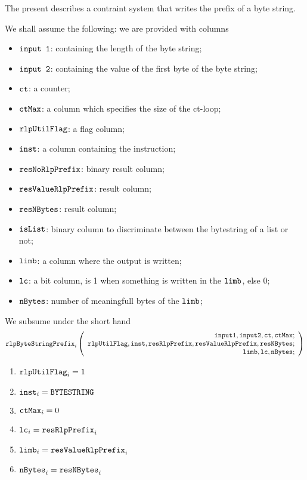 The present describes a contraint system that writes the \rlp{} prefix of a byte string.

We shall assume the following: we are provided with columns
\begin{itemize}
    \item $\texttt{input 1}$: containing the length of the byte string;
    \item $\texttt{input 2}$: containing the value of the first byte of the byte string;
    \item $\texttt{ct}$: a counter;
    \item $\texttt{ctMax}$: a column which specifies the size of the ct-loop;

    \item $\texttt{rlpUtilFlag}$: a flag column;
    \item $\texttt{inst}$: a column containing the instruction;
    \item $\texttt{resNoRlpPrefix}$: binary result column;
    \item $\texttt{resValueRlpPrefix}$: result column;
    \item $\texttt{resNBytes}$: result column;
    \item $\texttt{isList}$: binary column to discriminate between the bytestring of a list or not;

    \item $\texttt{limb}$: a column where the output is written;
    \item $\texttt{lc}$: a bit column, is 1 when something is written in the $\texttt{limb}$, else 0;
    \item $\texttt{nBytes}$: number of meaningfull bytes of the $\texttt{limb}$;
\end{itemize}

\noindent We subsume under the short hand
\[
    \texttt{rlpByteStringPrefix}_{i}
    \left(
	\begin{array}{r}
    \texttt{input1},
    \texttt{input2},
    \texttt{ct},
    \texttt{ctMax}; \\
    \texttt{rlpUtilFlag},
    \texttt{inst},
    \texttt{resRlpPrefix},
    \texttt{resValueRlpPrefix},
    \texttt{resNBytes}; \\
    \texttt{limb},
    \texttt{lc},
    \texttt{nBytes}; \\
    \end{array}
	\right)
\]

\begin{enumerate}
    \item $\texttt{rlpUtilFlag}_{i} = 1$
    \item $\texttt{inst}_{i}        = \texttt{BYTESTRING}$
    \item $\texttt{ctMax}_{i}       = 0$

    \item $\texttt{lc}_{i}     = \texttt{resRlpPrefix}_{i}$
    \item $\texttt{limb}_{i}   = \texttt{resValueRlpPrefix}_{i}$
    \item $\texttt{nBytes}_{i} = \texttt{resNBytes}_{i}$
\end{enumerate}
